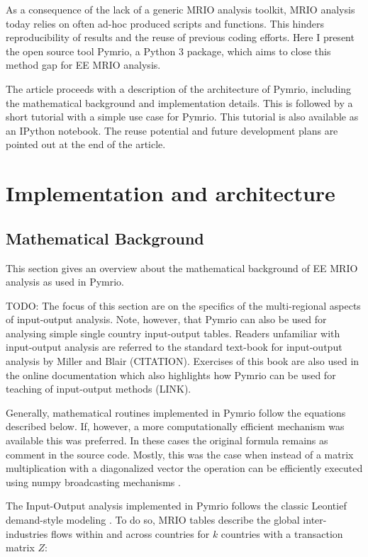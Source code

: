 \documentclass{jors}
\begin{document}
{As a consequence of the lack of a generic MRIO analysis toolkit, MRIO analysis today relies on often ad-hoc produced scripts and functions. This hinders reproducibility of results and the reuse of previous coding efforts.
Here I present the open source tool Pymrio, a Python 3 package, which aims to close this method gap for EE MRIO analysis.

The article proceeds with a description of the architecture of Pymrio, including the mathematical background and implementation details. 
This is followed by a short tutorial with a simple use case for Pymrio. This tutorial is also available as an IPython notebook. 
The reuse potential and future development plans are pointed out at the end of the article.


\section*{Implementation and architecture}

\subsection*{Mathematical Background}

This section gives an overview about the mathematical background of EE MRIO analysis as used in Pymrio. 

TODO: The focus of this section are on the specifics of the multi-regional aspects of input-output analysis. Note, however, that Pymrio can also be used for analysing simple single country input-output tables. Readers unfamiliar with input-output analysis are referred to the standard text-book for input-output analysis by Miller and Blair (CITATION). Exercises of this book are also used in the online documentation which also highlights how Pymrio can be used for teaching of input-output methods (LINK). 

Generally, mathematical routines implemented in Pymrio follow the equations described below.
If, however, a more computationally efficient mechanism was available this was preferred.
In these cases the original formula remains as comment in the source code.
Mostly,  this was the case when instead of a matrix multiplication with a diagonalized vector the operation can be efficiently executed using numpy broadcasting mechanisms \cite{vanderwalt2011}.

The Input-Output analysis implemented in Pymrio follows the classic Leontief demand-style modeling  \cite{leontief1970}.
To do so, MRIO tables describe the global inter-industries flows within and across countries for $k$ countries with a transaction matrix $Z$:

}
\end{document}
